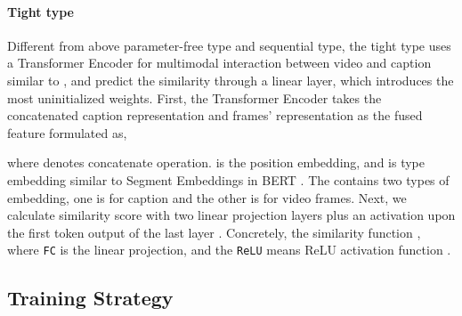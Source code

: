 \documentclass[11pt]{article}
\begin{document}
	\paragraph{Tight type}
	Different from above parameter-free type and sequential type, the tight type uses a Transformer Encoder \cite{vaswani2017attention} for multimodal interaction between video and caption similar to \cite{Luo2020UniVL}, and predict the similarity through a linear layer, which introduces the most uninitialized weights. First, the Transformer Encoder takes the concatenated caption representation  and frames' representation  as the fused feature  formulated as,
	
	where  denotes concatenate operation.  is the position embedding, and  is type embedding similar to Segment
	Embeddings in BERT \cite{devlin2019bert}. The  contains two types of embedding, one is for caption and the other is for video frames. Next, we calculate similarity score with two linear projection layers plus an activation upon the first token output of the last layer . Concretely, the similarity function , where \texttt{FC} is the linear projection, and the \texttt{ReLU} means ReLU activation function \cite{Agarap2018ReLU}.

	\subsection{Training Strategy}
\end{document}
